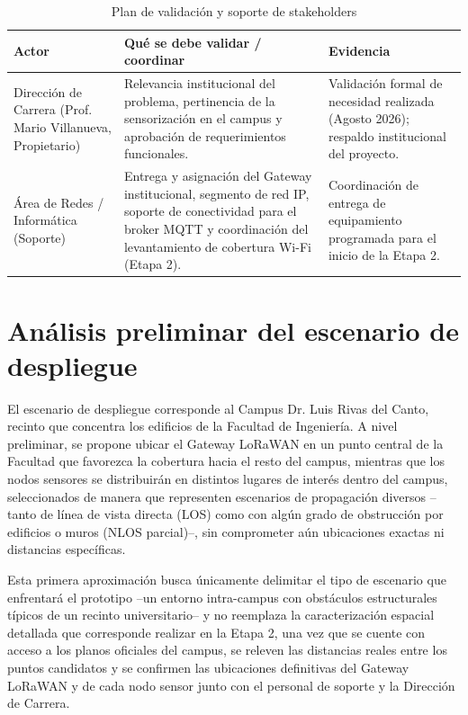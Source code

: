 \documentclass[12pt,oneside,openany,spanish,oldfontcommands]{memoir}
\begin{document}
\begin{table}[H]
\centering
\caption{Plan de validación y soporte de stakeholders}
\label{tab:validacion-stakeholders}
\small
\begin{tabularx}{\textwidth}{p{3.4cm} X X}
\toprule
\textbf{Actor} & \textbf{Qué se debe validar / coordinar} & \textbf{Evidencia}\\
\midrule
Dirección de Carrera (Prof. Mario Villanueva, Propietario)
&
Relevancia institucional del problema, pertinencia de la sensorización en el campus y aprobación de requerimientos funcionales.
&
Validación formal de necesidad realizada (Agosto 2026); respaldo institucional del proyecto.
\\
\midrule
Área de Redes / Informática (Soporte)
&
Entrega y asignación del Gateway institucional, segmento de red IP, soporte de conectividad para el broker MQTT y coordinación del levantamiento de cobertura Wi-Fi (Etapa 2).
&
Coordinación de entrega de equipamiento programada para el inicio de la Etapa 2.
\\
\bottomrule
\end{tabularx}
\end{table}

\section{Análisis preliminar del escenario de despliegue}

El escenario de despliegue corresponde al Campus Dr. Luis Rivas del Canto, recinto que
concentra los edificios de la Facultad de Ingeniería. A nivel preliminar, se propone
ubicar el Gateway LoRaWAN en un punto central de la Facultad que favorezca la cobertura
hacia el resto del campus, mientras que los nodos sensores se distribuirán en distintos
lugares de interés dentro del campus, seleccionados de manera que representen escenarios
de propagación diversos --tanto de línea de vista directa (LOS) como con algún grado de
obstrucción por edificios o muros (NLOS parcial)--, sin comprometer aún ubicaciones
exactas ni distancias específicas.

Esta primera aproximación busca únicamente delimitar el tipo de escenario que enfrentará
el prototipo --un entorno intra-campus con obstáculos estructurales típicos de un recinto
universitario-- y no reemplaza la caracterización espacial detallada que corresponde
realizar en la Etapa 2, una vez que se cuente con acceso a los planos oficiales del
campus, se releven las distancias reales entre los puntos candidatos y se confirmen las
ubicaciones definitivas del Gateway LoRaWAN y de cada nodo sensor junto con el personal de
soporte y la Dirección de Carrera.
\end{document}
